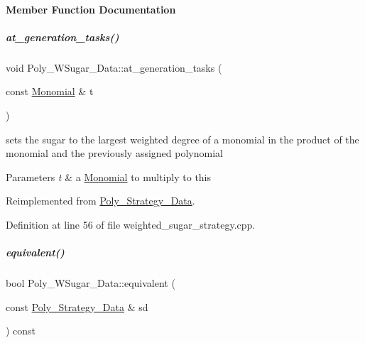 \paragraph{Member Function Documentation}
\mbox{\label{group__strategygroup_ac58bd8d30e7e10dbbe8e86b1d9d04376}} 
\subparagraph{\texorpdfstring{at\+\_\+generation\+\_\+tasks()}{at\_generation\_tasks()}}
{\footnotesize\ttfamily void Poly\+\_\+\+W\+Sugar\+\_\+\+Data\+::at\+\_\+generation\+\_\+tasks (\begin{DoxyParamCaption}\item[{const \hyperlink{group__polygroup_class_monomial}{Monomial} \&}]{t }\end{DoxyParamCaption})\hspace{0.3cm}{\ttfamily [virtual]}}



sets the sugar to the largest weighted degree of a monomial in the product of the monomial and the previously assigned polynomial 


\begin{DoxyParams}{Parameters}
{\em t} & a \hyperlink{group__polygroup_class_monomial}{Monomial} to multiply to {\ttfamily this} \\
\hline
\end{DoxyParams}


Reimplemented from \hyperlink{group__strategygroup_a6683749a5fb30b6f91075a28899fbfe7}{Poly\+\_\+\+Strategy\+\_\+\+Data}.



Definition at line 56 of file weighted\+\_\+sugar\+\_\+strategy.\+cpp.

\mbox{\label{group__strategygroup_a50b4b29d57fb8bed56174733207369dd}} 
\subparagraph{\texorpdfstring{equivalent()}{equivalent()}}
{\footnotesize\ttfamily bool Poly\+\_\+\+W\+Sugar\+\_\+\+Data\+::equivalent (\begin{DoxyParamCaption}\item[{const \hyperlink{group__strategygroup_class_poly___strategy___data}{Poly\+\_\+\+Strategy\+\_\+\+Data} \&}]{sd }\end{DoxyParamCaption}) const\hspace{0.3cm}{\ttfamily [virtual]}}



